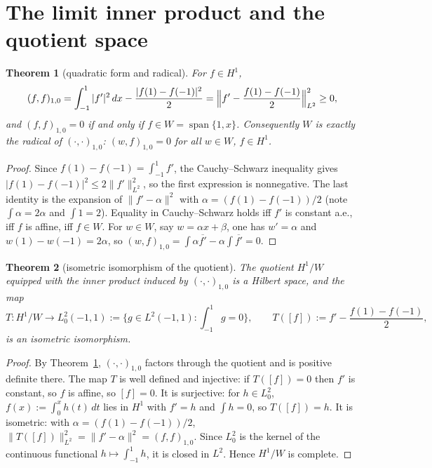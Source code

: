 ﻿\documentclass[11pt]{article}
\newtheorem{theorem}{Theorem}[section]
\begin{document}
\section{The limit inner product and the quotient space}

\begin{theorem}[quadratic form and radical]\label{thm:radical}
	For $f\in H^1$,
	\begin{equation*}
		(f,f)_{1,0}=\int_{-1}^1|f'|^2\,dx-\frac{|f(1)-f(-1)|^2}{2}
		=\Bigl\|f'-\frac{f(1)-f(-1)}2\Bigr\|_{L^2}^2\ge 0,
	\end{equation*}
	and $(f,f)_{1,0}=0$ if and only if $f\in W=\operatorname{span}\{1,x\}$.
	Consequently $W$ is exactly the radical of $(\cdot,\cdot)_{1,0}$:
	$(w,f)_{1,0}=0$ for all $w\in W$, $f\in H^1$.
\end{theorem}

\begin{proof}
	Since $f(1)-f(-1)=\int_{-1}^1 f'$, the Cauchy--Schwarz inequality gives
	$|f(1)-f(-1)|^2\le 2\|f'\|_{L^2}^2$, so the first expression is
	nonnegative.  The last identity is the expansion of
	$\|f'-\alpha\|^2$ with $\alpha=(f(1)-f(-1))/2$ (note $\int\alpha =2\alpha$
	and $\int 1 =2$).  Equality in Cauchy--Schwarz holds iff $f'$ is constant
	a.e., iff $f$ is affine, iff $f\in W$.  For $w\in W$, say $w=\alpha x+\beta$,
	one has $w'=\alpha$ and $w(1)-w(-1)=2\alpha$, so
	$(w,f)_{1,0}=\int \alpha\overline{f'}-\alpha\int\overline{f'}=0$.
\end{proof}

\begin{theorem}[isometric isomorphism of the quotient]\label{thm:quotient}
	The quotient $H^1/W$ equipped with the inner product induced by
	$(\cdot,\cdot)_{1,0}$ is a Hilbert space, and the map
	\begin{equation*}
		T\colon H^1/W\to L^2_0(-1,1):=\{g\in L^2(-1,1): \int_{-1}^1 g=0\},
		\qquad
		T([f]):=f'-\frac{f(1)-f(-1)}2,
	\end{equation*}
	is an isometric isomorphism.
\end{theorem}

\begin{proof}
	By Theorem~\ref{thm:radical}, $(\cdot,\cdot)_{1,0}$ factors through the
	quotient and is positive definite there.  The map $T$ is well defined and
	injective: if $T([f])=0$ then $f'$ is constant, so $f$ is affine, so
	$[f]=0$.  It is surjective: for $h\in L^2_0$, $f(x):=\int_0^x h(t)\,dt$
	lies in $H^1$ with $f'=h$ and $\int h=0$, so $T([f])=h$.  It is
	isometric: with $\alpha=(f(1)-f(-1))/2$,
	$\|T([f])\|_{L^2}^2=\|f'-\alpha\|^2=(f,f)_{1,0}$.
	Since $L^2_0$ is the kernel of the continuous functional
	$h\mapsto\int_{-1}^1h$, it is closed in $L^2$.  Hence $H^1/W$ is complete.
\end{proof}
\end{document}
